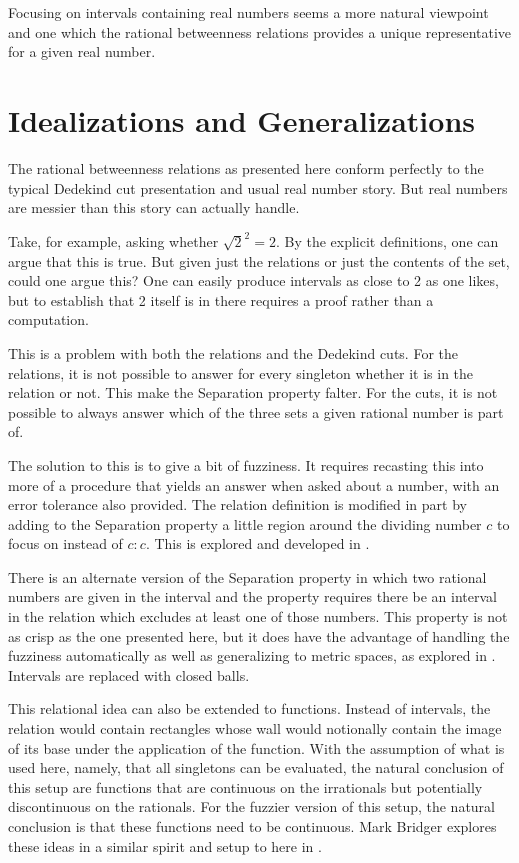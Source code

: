 \documentclass[12pt]{article}
\begin{document}
Focusing on intervals containing real numbers seems a more natural viewpoint and one which the rational betweenness relations provides a unique representative for a given real number. 


\section{Idealizations and Generalizations}

The rational betweenness relations as presented here conform perfectly to the typical Dedekind cut presentation and usual real number story. But real numbers are messier than this story can actually handle. 

Take, for example, asking whether $\sqrt{2}^2 = 2$. By the explicit definitions, one can argue that this is true. But given just the relations or just the contents of the set, could one argue this? One can easily produce intervals as close to 2 as one likes, but to establish that 2 itself is in there requires a proof rather than a computation. 

This is a problem with both the relations and the Dedekind cuts. For the relations, it is not possible to answer for every singleton whether it is in the relation or not. This make the Separation property falter. For the cuts, it is not possible to always answer which of the three sets a given rational number is part of. 

The solution to this is to give a bit of fuzziness. It requires recasting this into more of a procedure that yields an answer when asked about a number, with an error tolerance also provided. The relation definition is modified in part by adding to the Separation property a little region around the dividing number $c$ to focus on instead of $c:c$. This is explored and developed in \cite{taylor23main}.

There is an alternate version of the Separation property in which two rational numbers are given in the interval and the property requires there be an interval in the relation which excludes at least one of those numbers. This property is not as crisp as the one presented here, but it does have the advantage of handling the fuzziness automatically as well as generalizing to metric spaces, as explored in \cite{taylor23metric}. Intervals are replaced with closed balls. 

This relational idea can also be extended to functions. Instead of intervals, the relation would contain rectangles whose wall would notionally contain the image of its base under the application of the function. With the assumption of what is used here, namely, that all singletons can be evaluated, the natural conclusion of this setup are functions that are continuous on the irrationals but potentially discontinuous on the rationals. For the fuzzier version of this setup, the natural conclusion is that these functions need to be continuous. Mark Bridger explores  these ideas in a similar spirit and setup to here in \cite{bridger}.
\end{document}
